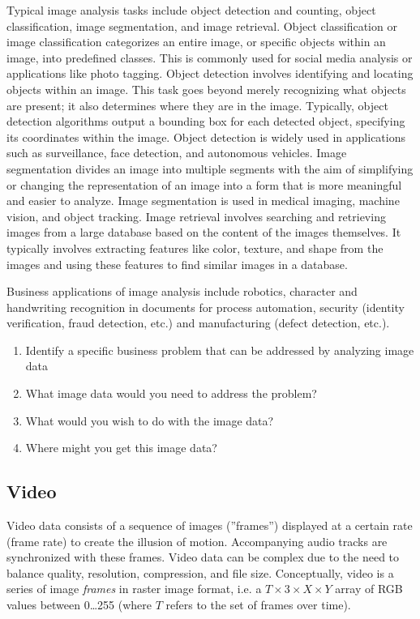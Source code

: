 Typical image analysis tasks include object detection and counting, object classification, image segmentation, and image retrieval. Object classification or image classification categorizes an entire image, or specific objects within an image, into predefined classes. This is commonly used for social media analysis or applications like photo tagging. Object detection involves identifying and locating objects within an image. This task goes beyond merely recognizing what objects are present; it also determines where they are in the image. Typically, object detection algorithms output a bounding box for each detected object, specifying its coordinates within the image. Object detection is widely used in applications such as surveillance, face detection, and autonomous vehicles. Image segmentation divides an image into multiple segments with the aim of simplifying or changing the representation of an image into a form that is more meaningful and easier to analyze. Image segmentation is used in medical imaging, machine vision, and object tracking. Image retrieval involves searching and retrieving images from a large database based on the content of the images themselves. It typically involves extracting features like color, texture, and shape from the images and using these features to find similar images in a database. 

Business applications of image analysis include robotics, character and handwriting recognition in documents for process automation, security (identity verification, fraud detection, etc.) and manufacturing (defect detection, etc.).

\begin{exerciseboxpaper}
\begin{enumerate}
	\item Identify a specific business problem that can be addressed by analyzing image data
	\item What image data would you need to address the problem?
	\item What would you wish to do with the image data?
	\item Where might you get this image data?
\end{enumerate}
\end{exerciseboxpaper}

\subsection*{Video}

Video data consists of a sequence of images (''frames'') displayed at a certain rate (frame rate) to create the illusion of motion. Accompanying audio tracks are synchronized with these frames. Video data can be complex due to the need to balance quality, resolution, compression, and file size. Conceptually, video is a series of image \emph{frames} in raster image format, i.e. a $T \times 3 \times X \times Y$ array of RGB values between 0\ldots255 (where $T$ refers to the set of frames over time).

